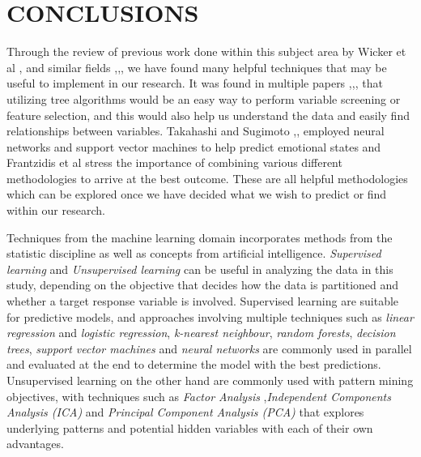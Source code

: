 \documentclass[letterpaper, 10 pt, conference]{ieeeconf}  %
\begin{document}
   
\section{CONCLUSIONS}

Through the review of previous work done within this subject area by Wicker et al \cite{NATURE},\cite{Wicker:2015:CDM:2783258.2783404} and similar fields \cite{4601732},\cite{Takahashi2008},\cite{5373931}, we have found many helpful techniques that may be useful to implement in our research.  It was found in multiple papers \cite{Wicker:2015:CDM:2783258.2783404},\cite{NATURE},\cite{4601732},\cite{Takahashi2008} that utilizing tree algorithms would be an easy way to perform variable screening or feature selection, and this would also help us understand the data and easily find relationships between variables. Takahashi and Sugimoto \cite{4601732},\cite{Takahashi2008}, employed neural networks and support vector machines to help predict emotional states and Frantzidis et al \cite{5373931} stress the importance of combining various different methodologies to arrive at the best outcome.  These are all helpful methodologies which can be explored once we have decided what we wish to predict or find within our research.

Techniques from the machine learning \cite{geron2017hands} domain incorporates methods from the statistic discipline as well as concepts from artificial intelligence. \textit{Supervised learning} \cite{geron2017hands} and \textit{Unsupervised learning} \cite{Gentleman2008} can be useful in analyzing the data in this study, depending on the objective that decides how the data is partitioned and whether a target response variable is involved. Supervised learning are suitable for predictive models, and approaches involving multiple techniques such as \textit{linear regression} and \textit{logistic regression}, \textit{k-nearest neighbour}, \textit{random forests}, \textit{decision trees}, \textit{support vector machines} and \textit{neural networks} are commonly used in parallel and evaluated at the end to determine the model with the best predictions. Unsupervised learning on the other hand are commonly used with pattern mining objectives, with techniques such as \textit{Factor Analysis} ,\textit{Independent Components Analysis (ICA)} and \textit{Principal Component Analysis (PCA)} that explores underlying patterns and potential hidden variables with each of their own advantages.
\end{document}
